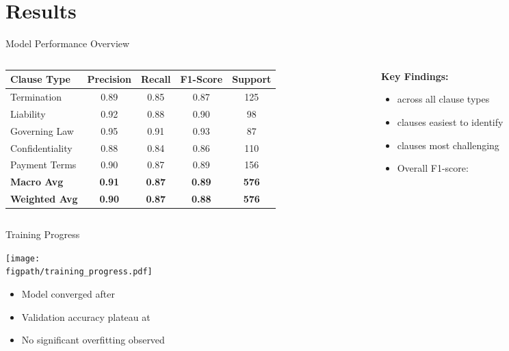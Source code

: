 
\section{Results}

\begin{frame}{Model Performance Overview}
\begin{columns}
\begin{column}{0.6\textwidth}
\begin{table}[h]
\centering
\begin{tabular}{@{}lcccc@{}}
\toprule
\textbf{Clause Type} & \textbf{Precision} & \textbf{Recall} & \textbf{F1-Score} & \textbf{Support} \\
\midrule
Termination & 0.89 & 0.85 & 0.87 & 125 \\
Liability & 0.92 & 0.88 & 0.90 & 98 \\
Governing Law & 0.95 & 0.91 & 0.93 & 87 \\
Confidentiality & 0.88 & 0.84 & 0.86 & 110 \\
Payment Terms & 0.90 & 0.87 & 0.89 & 156 \\
\midrule
\textbf{Macro Avg} & \textbf{0.91} & \textbf{0.87} & \textbf{0.89} & \textbf{576} \\
\textbf{Weighted Avg} & \textbf{0.90} & \textbf{0.87} & \textbf{0.88} & \textbf{576} \\
\bottomrule
\end{tabular}
\end{table}
\end{column}
\begin{column}{0.4\textwidth}
\textbf{Key Findings:}
\begin{itemize}
    \item {} across all clause types
    \item {} clauses easiest to identify
    \item {} clauses most challenging
    \item Overall F1-score: 
\end{itemize}
\end{column}
\end{columns}
\end{frame}

\begin{frame}{Training Progress}
\begin{center}
\texttt{[image: \\figpath/training\_progress.pdf]}
\end{center}

\begin{itemize}
    \item Model converged after 
    \item Validation accuracy plateau at 
    \item No significant overfitting observed
\end{itemize}
\end{frame}

